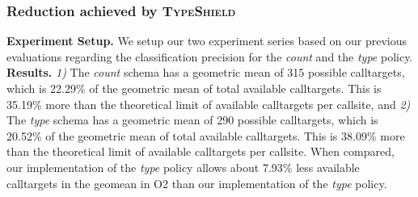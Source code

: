 \subsubsection{Reduction achieved by \textsc{TypeShield}}
\label{subsection:typeshieldvslimitcount}
\textbf{Experiment Setup.} We setup our two experiment series based on our previous evaluations regarding the classification precision for the \textit{count} and the \textit{type} policy.
\textbf{Results.}
\textit{1)}  The \textit{count} schema has a geometric mean of 315 possible calltargets, which is 22.29\% of the geometric mean of total available 
calltargets. This is 35.19\% more than the theoretical limit of available calltargets per callsite, and
\textit{2)}  The \textit{type} schema has a geometric mean of 290 possible calltargets, which is 20.52\% of the geometric mean of total available
calltargets. This is 38.09\% more than the theoretical limit of available calltargets per callsite.
When compared, our implementation of the \textit{type} policy allows about 7.93\% less available calltargets in the geomean in O2 than our implementation of the \textit{type} policy.


